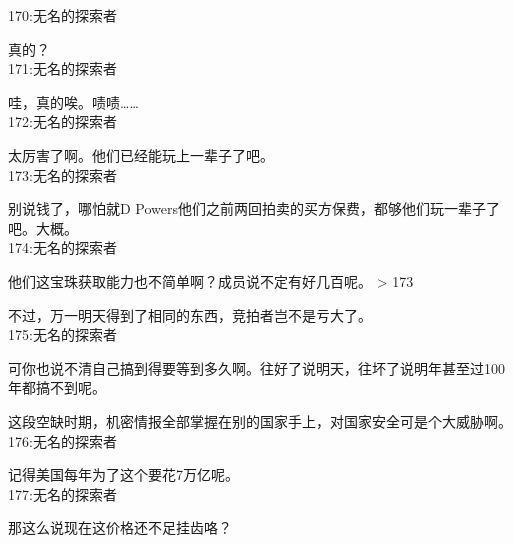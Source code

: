 170:无名的探索者

真的？\\

171:无名的探索者

哇，真的唉。啧啧……\\

172:无名的探索者

太厉害了啊。他们已经能玩上一辈子了吧。\\

173:无名的探索者

别说钱了，哪怕就D Powers他们之前两回拍卖的买方保费，都够他们玩一辈子了吧。大概。\\

174:无名的探索者

他们这宝珠获取能力也不简单啊？成员说不定有好几百呢。 > 173

不过，万一明天得到了相同的东西，竞拍者岂不是亏大了。\\

175:无名的探索者

可你也说不清自己搞到得要等到多久啊。往好了说明天，往坏了说明年甚至过100年都搞不到呢。

这段空缺时期，机密情报全部掌握在别的国家手上，对国家安全可是个大威胁啊。\\

176:无名的探索者

记得美国每年为了这个要花7万亿呢。\\

177:无名的探索者

那这么说现在这价格还不足挂齿咯？\\

